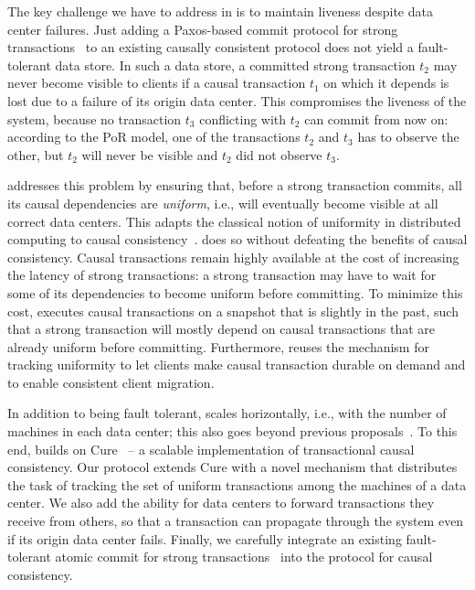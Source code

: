 The key challenge we have to address in \System is to maintain liveness despite
data center failures. Just adding a Paxos-based commit protocol for strong
transactions~\cite{discpaper,spanner,mdcc} to an existing causally consistent
protocol does not yield a fault-tolerant data store.
In such a data store, a committed strong transaction $t_2$ may never become
visible to clients if a causal transaction $t_1$ on which it depends is lost due
to a failure of its origin data center. This compromises the liveness of the
system, because no transaction $t_3$ conflicting with $t_2$ can commit
from now on: according to the PoR model, one of the transactions $t_2$ and
$t_3$ has to observe the other, but $t_2$ will never be visible and
$t_2$ did not observe $t_3$.

\System addresses this problem by ensuring that, before a strong transaction
commits, all its causal dependencies are \emph{uniform}, i.e., will eventually
become visible at all correct data centers. This adapts the classical notion of
uniformity in distributed computing to causal
consistency~\cite{cachin-book}. \System does so without defeating the benefits
of causal consistency. Causal transactions remain
highly available at the cost of increasing the latency of strong
transactions: a strong transaction may have to wait for some of its
dependencies to become uniform before committing. To minimize this cost,
\System executes causal transactions on a snapshot that is slightly in the
past, such that a strong transaction will mostly depend on causal
transactions that are already uniform before committing.
Furthermore, \System reuses the mechanism for
tracking uniformity to let clients make causal transaction durable on
demand and to enable consistent client migration.


In addition to being fault tolerant, \System scales horizontally, i.e., with the
number of machines in each data center;
this also goes beyond previous proposals~\cite{valter,red-blue,por}. To this
end, \System builds on Cure~\cite{cure} -- a scalable implementation of
transactional causal consistency. Our protocol extends Cure with a novel
mechanism that distributes the task of tracking the set of uniform transactions
among the machines of a data center.
We also add the ability for data centers to
forward transactions they receive from others, so that a transaction can
propagate through the system even if its origin data center fails.
Finally, we carefully integrate an existing fault-tolerant atomic commit for
strong transactions~\cite{discpaper} into the protocol for causal consistency.

